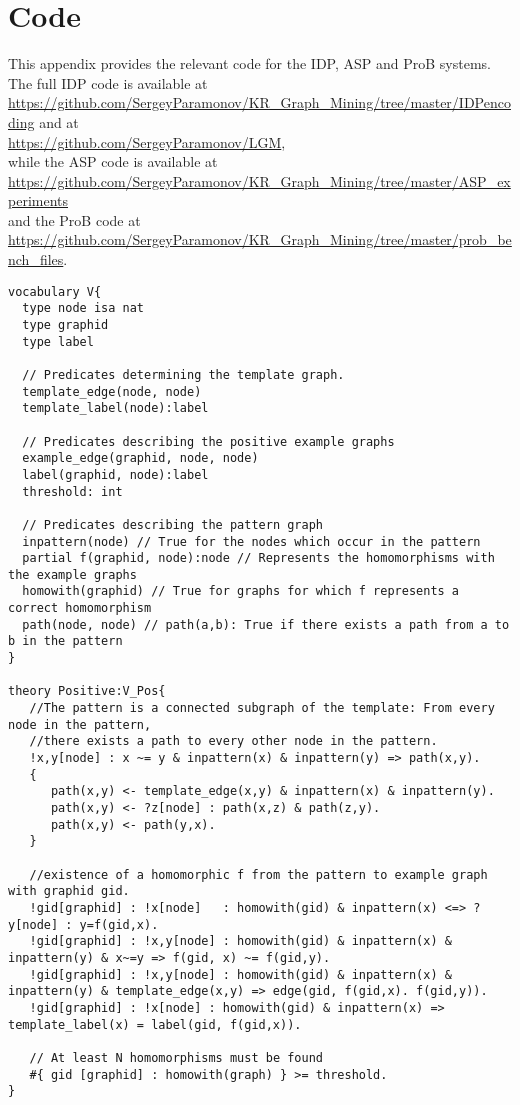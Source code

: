 \section{Code}
\label{app:Code}
This appendix provides the relevant code for the IDP, ASP and ProB systems.
The full IDP code is available at\\ \url{https://github.com/SergeyParamonov/KR_Graph_Mining/tree/master/IDPencoding} and at \\\url{https://github.com/SergeyParamonov/LGM},\\ while the ASP code is available at\\ \url{https://github.com/SergeyParamonov/KR_Graph_Mining/tree/master/ASP_experiments}\\ and the ProB code at \\\url{https://github.com/SergeyParamonov/KR_Graph_Mining/tree/master/prob_bench_files}. 
\begin{lstlisting}[caption=IDP positive constraint, style=model, label=lst:IDPPos]
vocabulary V{
  type node isa nat
  type graphid
  type label

  // Predicates determining the template graph.
  template_edge(node, node) 
  template_label(node):label

  // Predicates describing the positive example graphs
  example_edge(graphid, node, node)
  label(graphid, node):label
  threshold: int

  // Predicates describing the pattern graph
  inpattern(node) // True for the nodes which occur in the pattern
  partial f(graphid, node):node // Represents the homomorphisms with the example graphs
  homowith(graphid) // True for graphs for which f represents a correct homomorphism
  path(node, node) // path(a,b): True if there exists a path from a to b in the pattern
}

theory Positive:V_Pos{
   //The pattern is a connected subgraph of the template: From every node in the pattern, 
   //there exists a path to every other node in the pattern.
   !x,y[node] : x ~= y & inpattern(x) & inpattern(y) => path(x,y).
   {
      path(x,y) <- template_edge(x,y) & inpattern(x) & inpattern(y).
      path(x,y) <- ?z[node] : path(x,z) & path(z,y).
      path(x,y) <- path(y,x).
   }

   //existence of a homomorphic f from the pattern to example graph with graphid gid.
   !gid[graphid] : !x[node]   : homowith(gid) & inpattern(x) <=> ? y[node] : y=f(gid,x).
   !gid[graphid] : !x,y[node] : homowith(gid) & inpattern(x) & inpattern(y) & x~=y => f(gid, x) ~= f(gid,y).
   !gid[graphid] : !x,y[node] : homowith(gid) & inpattern(x) & inpattern(y) & template_edge(x,y) => edge(gid, f(gid,x). f(gid,y)).
   !gid[graphid] : !x[node] : homowith(gid) & inpattern(x) => template_label(x) = label(gid, f(gid,x)).

   // At least N homomorphisms must be found
   #{ gid [graphid] : homowith(graph) } >= threshold.
}
\end{lstlisting}


